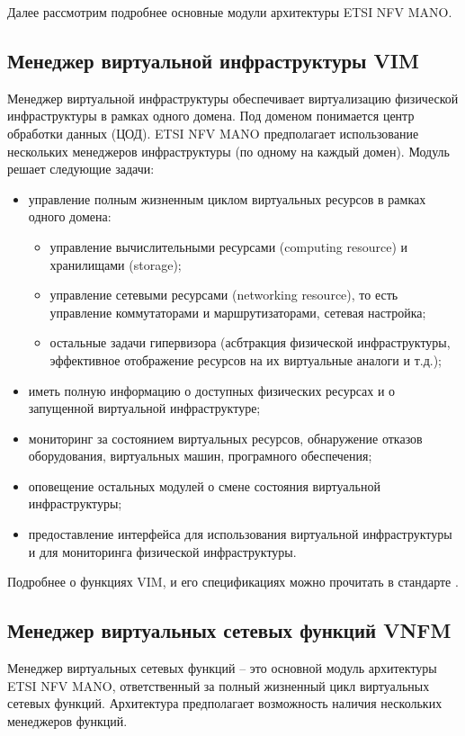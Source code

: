 \documentclass[oneside,final,14pt,a4paper]{extreport}
\begin{document}
Далее рассмотрим подробнее основные модули архитектуры ETSI NFV MANO.

\subsection{Менеджер виртуальной инфраструктуры VIM}
Менеджер виртуальной инфраструктуры обеспечивает виртуализацию физической инфраструктуры в рамках одного домена. Под доменом понимается центр обработки данных (ЦОД). ETSI NFV MANO предполагает использование нескольких менеджеров инфраструктуры (по одному на каждый домен). Модуль решает следующие задачи:

\begin{itemize}
	\item управление полным жизненным циклом виртуальных ресурсов в рамках одного домена:
	\begin{itemize}
		\item управление вычислительными ресурсами (computing resource) и хранилищами (storage);
		\item управление сетевыми ресурсами (networking resource), то есть управление коммутаторами и маршрутизаторами, сетевая настройка;
		\item остальные задачи гипервизора (асбтракция физической инфраструктуры, эффективное отображение ресурсов на их виртуальные аналоги и т.д.);
	\end{itemize}
	\item иметь полную информацию о доступных физических ресурсах и о запущенной виртуальной инфраструктуре;
	\item мониторинг за состоянием виртуальных ресурсов, обнаружение отказов оборудования, виртуальных машин, програмного обеспечения;
	\item оповещение остальных модулей о смене состояния виртуальной инфраструктуры;
	\item предоставление интерфейса для использования виртуальной инфраструктуры и для мониторинга физической инфраструктуры.
\end{itemize}

Подробнее о функциях VIM, и его спецификациях можно прочитать в стандарте \cite{nfv-mano-official-2016-04}.

\subsection{Менеджер виртуальных сетевых функций VNFM}
Менеджер виртуальных сетевых функций -- это основной модуль архитектуры ETSI NFV MANO, ответственный за  полный жизненный цикл виртуальных сетевых функций. Архитектура предполагает возможность наличия нескольких менеджеров функций.
\end{document}
